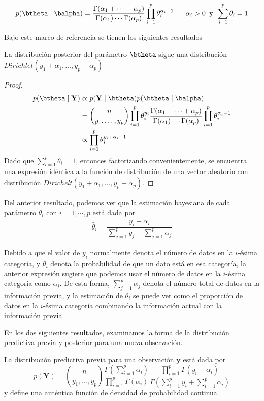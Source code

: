 \documentclass[10pt,openright]{book}\usepackage[]{graphicx}\usepackage[]{color}
\begin{document}
  \begin{equation}
  p(\btheta \mid \balpha)=\frac{\Gamma(\alpha_1+\cdots+\alpha_p)}{\Gamma(\alpha_1)\cdots\Gamma(\alpha_p)}
  \prod_{i=1}^p\theta_i^{\alpha_i-1} \ \ \ \ \ \alpha_i>0 \texttt{ y } \sum_{i=1}^p\theta_i=1
  \end{equation}
  
Bajo este marco de referencia se tienen los siguientes resultados
  
\begin{Res}
La distribuci\'on posterior del par\'ametro $\btheta$ sigue una distribuci\'on $Dirichlet(y_1+\alpha_1,\ldots,y_p+\alpha_p)$
\end{Res}

\begin{proof}
\begin{align*}
p(\btheta \mid \mathbf{Y})&\propto p(\mathbf{Y} \mid \btheta)p(\btheta \mid \balpha)\\
&=\binom{n}{y_1,\ldots,y_p}\prod_{i=1}^p\theta_i^{y_i}\frac{\Gamma(\alpha_1+\cdots+\alpha_p)}{\Gamma(\alpha_1)
  \cdots\Gamma(\alpha_p)}
\prod_{i=1}^p\theta_i^{\alpha_i-1}\\
&\propto \prod_{i=1}^p\theta_i^{y_i+\alpha_i-1}
\end{align*}
Dado que $\sum_{i=1}^p\theta_i=1$, entonces factorizando convenientemente, se encuentra una expresi\'on id\'entica a la funci\'on de distribuci\'on de una vector aleatorio con distribuci\'on $Dirichelt(y_1+\alpha_1,\ldots,y_p+\alpha_p)$.
\end{proof}

Del anterior resultado, podemos ver que la estimaci\'on bayesiana de cada par\'ametro $\theta_i$ con $i=1,\cdots,p$ est\'a dada por
\begin{align*}
\hat{\theta}_i=\dfrac{y_i+\alpha_i}{\sum_{j=1}^py_j+\sum_{j=1}^p\alpha_j}
\end{align*}

Debido a que el valor de $y_i$ normalmente denota el n\'umero de datos en la $i$-\'esima categor\'ia, y $\theta_i$ denota la probabilidad de que un dato est\'a en esa categor\'ia, la anterior expresi\'on sugiere que podemos usar el n\'umero de datos en la $i$-\'esima categor\'ia como $\alpha_i$. De esta forma, $\sum_{j=1}^p\alpha_j$ denota el n\'umero total de datos en la informaci\'on previa, y la estimaci\'on de $\theta_i$ se puede ver como el proporci\'on de datos en la $i$-\'esima categor\'ia combinando la informaci\'on actual con la informaci\'on previa.

En los dos siguientes resultados, examinamos la forma de la distribuci\'on predictiva previa y posterior para una nueva observaci\'on.
\begin{Res}
La distribuci\'on predictiva previa para una observaci\'on $\mathbf{y}$ est\'a dada por
\begin{equation}
p(\mathbf{Y})=\binom{n}{y_1,\ldots,y_p} \frac{\Gamma(\sum_{i=1}^p\alpha_i)}{\prod_{i=1}^p\Gamma(\alpha_i)}
\frac{\prod_{i=1}^p\Gamma(y_i+\alpha_i)}{\Gamma(\sum_{i=1}^py_i+\sum_{i=1}^p\alpha_i)}
\end{equation}
y define una aut\'entica funci\'on de densidad de probabilidad continua.
\end{Res}
\end{document}
